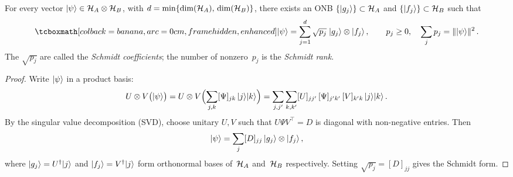 \begin{proposition}\label{prop:schmidt}
  For every vector $\lvert \psi \rangle \in \mathcal{H}_A \otimes \mathcal{H}_B$, with
  $d = \min\{\dim(\mathcal{H}_A),\, \dim(\mathcal{H}_B)\}$, there exists an ONB
  $\{\lvert g_j \rangle\} \subset \mathcal{H}_A$ and $\{\lvert f_j \rangle\} \subset \mathcal{H}_B$
  such that
  \begin{equation}\label{eq:schmidt}
    \eqbox{\ket{\psi}
      = \sum_{j=1}^{d} \sqrt{p_j}\;\ket{g_j} \tp \ket{f_j}}\,,\qquad
    p_j \geq 0,\quad
    \sum_j p_j = \norm{\ket{\psi}}^2\,.
  \end{equation}
  The $\sqrt{p_j}$ are called the \emph{Schmidt coefficients}; the
  number of nonzero~$p_j$ is the \emph{Schmidt rank}.
\end{proposition}

\begin{proof}
  Write $\lvert \psi \rangle$ in a product basis:
  \[
    U \otimes V \bigl(\lvert \psi \rangle\bigr)
    = U \otimes V \Bigl(\sum_{j,k} [\Psi]_{jk}\,\lvert j \rangle\lvert k \rangle\Bigr)
    = \sum_{j,j'}\sum_{k,k'} [U]_{jj'}\,[\Psi]_{j'k'}\,[V]_{k'k}\,
      \lvert j \rangle\lvert k \rangle\,.
  \]
  By the singular value decomposition (SVD), choose unitary $U,V$ such
  that $U\Psi V^\top = D$ is diagonal with non-negative entries.  Then
  \[
    \lvert \psi \rangle
    = \sum_{j} [D]_{jj}\,\lvert g_j \rangle\otimes\lvert f_j \rangle\,,
  \]
  where $\lvert g_j \rangle = U^\dagger\lvert j \rangle$ and $\lvert f_j \rangle = V^\dagger\lvert j \rangle$
  form orthonormal bases of~$\mathcal{H}_A$ and~$\mathcal{H}_B$ respectively.
  Setting $\sqrt{p_j} = [D]_{jj}$ gives the Schmidt form.
\end{proof}
